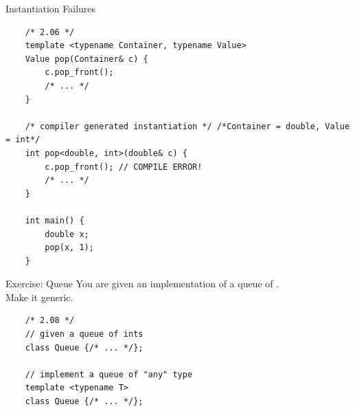 \begin{frame}[fragile]{Instantiation Failures}
  \begin{verbatim}
    /* 2.06 */
    template <typename Container, typename Value>
    Value pop(Container& c) {
        c.pop_front();
        /* ... */
    }

    /* compiler generated instantiation */ /*Container = double, Value = int*/
    int pop<double, int>(double& c) {
        c.pop_front(); // COMPILE ERROR!
        /* ... */
    }

    int main() {
        double x;
        pop(x, 1);
    }
  \end{verbatim}
\end{frame}

\begin{frame}[fragile]{Exercise: Queue}
  You are given an implementation of a queue of .\\
  Make it generic.

  \begin{verbatim}
    /* 2.08 */
    // given a queue of ints
    class Queue {/* ... */};

    // implement a queue of "any" type
    template <typename T>
    class Queue {/* ... */};
  \end{verbatim}
\end{frame}